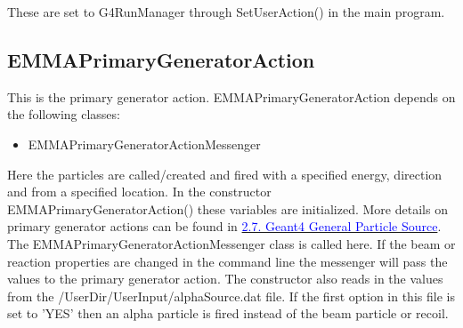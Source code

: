\documentclass{article}
\newcommand{\filefont}[1]{{\fontfamily{pnc}\selectfont #1}\xspace}
\newcommand{\hrefcolor}[2]{\href{#1}{\textcolor{blue}{#2}}\xspace}
\begin{document}
These are set to \filefont{G4RunManager} through \filefont{SetUserAction()} in the main program.

\subsection{EMMAPrimaryGeneratorAction}

This is the primary generator action. \filefont{EMMAPrimaryGeneratorAction} depends on the following classes:
\begin{itemize}
\item \filefont{EMMAPrimaryGeneratorActionMessenger}
\end{itemize}

Here the particles are called/created and fired with a specified energy, direction and from a specified location. In the constructor \filefont{EMMAPrimaryGeneratorAction()} these variables are initialized. More details on primary generator actions can be found in \hrefcolor{http://geant4.web.cern.ch/geant4/UserDocumentation/UsersGuides/ForApplicationDeveloper/html/ch02s07.html}{2.7. Geant4 General Particle Source}. The \filefont{EMMAPrimaryGeneratorActionMessenger} class is called here. If the beam or reaction properties are changed in the command line the messenger will pass the values to the primary generator action. The constructor also reads in the values from the \filefont{/UserDir/UserInput/alphaSource.dat} file. If the first option in this file is set to 'YES' then an alpha particle is fired instead of the beam particle or recoil.
\end{document}
